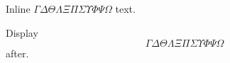 \documentclass[12pt]{article}
\begin{document}
Inline $\Gamma \Delta \Theta \Lambda \Xi \Pi \Sigma \Upsilon \Phi \Psi \Omega$ text.

Display \[ \Gamma \Delta \Theta \Lambda \Xi \Pi \Sigma \Upsilon \Phi \Psi \Omega \] after.
\end{document}
